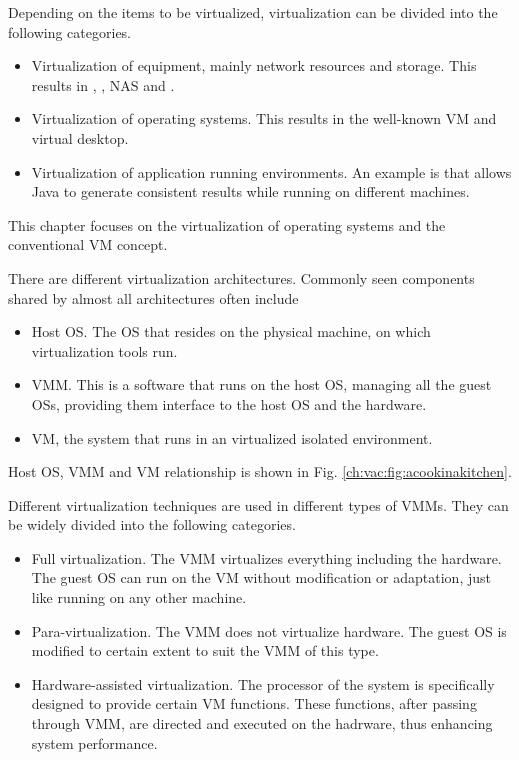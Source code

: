 Depending on the items to be virtualized, virtualization can be divided into the following categories.
\begin{itemize}
  \item Virtualization of equipment, mainly network resources and storage. This results in , , NAS and .
  \item Virtualization of operating systems. This results in the well-known VM and virtual desktop.
  \item Virtualization of application running environments. An example is  that allows Java to generate consistent results while running on different machines.
\end{itemize}
This chapter focuses on the virtualization of operating systems and the conventional VM concept.


There are different virtualization architectures. Commonly seen components shared by almost all architectures often include
\begin{itemize}
	\item Host OS. The OS that resides on the physical machine, on which virtualization tools run.
	\item VMM. This is a software that runs on the host OS, managing all the guest OSs, providing them interface to the host OS and the hardware.
	\item VM, the system that runs in an virtualized isolated environment.
\end{itemize}
Host OS, VMM and VM relationship is shown in Fig. \ref{ch:vac:fig:acookinakitchen}.

Different virtualization techniques are used in different types of VMMs. They can be widely divided into the following categories.
\begin{itemize}
	\item Full virtualization. The VMM virtualizes everything including the hardware. The guest OS can run on the VM without modification or adaptation, just like running on any other machine.
	\item Para-virtualization. The VMM does not virtualize hardware. The guest OS is modified to certain extent to suit the VMM of this type.
	\item Hardware-assisted virtualization. The processor of the system is specifically designed to provide certain VM functions. These functions, after passing through VMM, are directed and executed on the hadrware, thus enhancing system performance.
\end{itemize}


